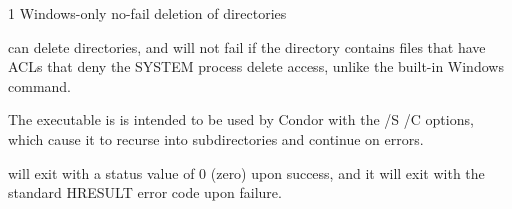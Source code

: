 \begin{ManPage}{\label{man-condor-rmdir}}{1}
{Windows-only no-fail deletion of directories}
\Synopsis
{}



\Description 

 can delete directories,
and will not fail if the directory contains files that have ACLs 
that deny the SYSTEM process delete access,
unlike the built-in Windows  command. 

The  executable is is intended to be used  
by Condor with the /S /C  options, 
which cause it to recurse into subdirectories and continue on errors.

\begin{Options}










\end{Options}

\ExitStatus

 will exit with a status value of 0 (zero) upon success,
and it will exit with the standard HRESULT error code upon failure.

\end{ManPage}
